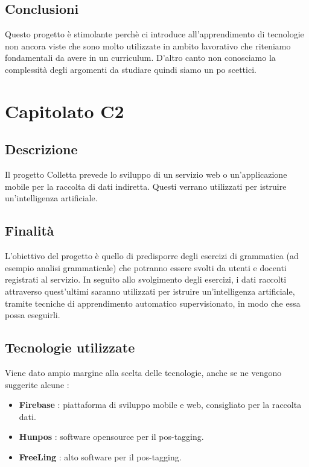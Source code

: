 \documentclass{article}
\begin{document}
        \subsection{Conclusioni}
            Questo progetto è stimolante perchè ci introduce all'apprendimento di tecnologie non ancora viste che sono molto utilizzate in ambito lavorativo che riteniamo fondamentali da avere in un curriculum. 
            D'altro canto non conosciamo la complessità degli argomenti da studiare quindi siamo un po scettici.
		
\newpage
        \section{Capitolato C2}
            \subsection{Descrizione}
                Il progetto Colletta prevede lo sviluppo di un servizio web o un'applicazione mobile per la raccolta di dati indiretta. Questi verrano utilizzati per istruire un'intelligenza artificiale.
            \subsection{Finalità}
                L'obiettivo del progetto è quello di predisporre degli esercizi di grammatica (ad esempio analisi grammaticale) che potranno essere svolti da utenti e docenti registrati al servizio.
                In seguito allo svolgimento degli esercizi, i dati raccolti attraverso quest'ultimi saranno utilizzati per istruire un'intelligenza artificiale, tramite tecniche di apprendimento automatico supervisionato, in modo che essa possa eseguirli.
            \subsection{Tecnologie utilizzate}
                Viene dato ampio margine alla scelta delle tecnologie, anche se ne vengono suggerite alcune :
                \begin{itemize} 
                    \item \textbf{Firebase} : piattaforma di sviluppo mobile e web, consigliato per la raccolta dati.
                    \item \textbf{Hunpos} : software opensource per il pos-tagging.
                    \item \textbf{FreeLing} : alto software per il pos-tagging.
				\end{itemize} 
\end{document}
